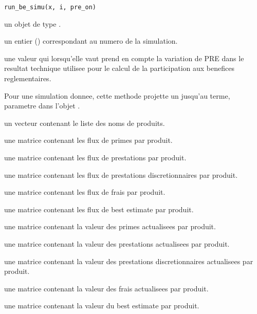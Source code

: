\documentclass[a4paper]{book}
\begin{document}
%
\begin{Usage}
\begin{verbatim}
run_be_simu(x, i, pre_on)
\end{verbatim}
\end{Usage}
%
\begin{Arguments}
\begin{ldescription}
\item[\code{x}] un objet de type .

\item[\code{i}] un entier () correspondant au numero de la simulation.

\item[\code{pre\_on}] une valeur  qui lorsqu'elle vaut  prend en compte la variation
de PRE dans le resultat technique utilisee pour le calcul de la participation aux benefices reglementaires.
\end{ldescription}
\end{Arguments}
%
\begin{Details}\relax
Pour une simulation donnee, cette methode projette un  jusqu'au terme, parametre dans
l'objet .
\end{Details}
%
\begin{Value}
 un vecteur contenant le liste des noms de produits.

 une matrice contenant les flux de primes par produit.

 une matrice contenant les flux de prestations par produit.

 une matrice contenant les flux de prestations discretionnaires par produit.

 une matrice contenant les flux de frais par produit.

 une matrice contenant les flux de best estimate par produit.

 une matrice contenant la valeur des primes actualisees par produit.

 une matrice contenant la valeur des prestations actualisees par produit.

 une matrice contenant la valeur des prestations
discretionnaires actualisees par produit.

 une matrice contenant la valeur des frais actualisees par produit.

 une matrice contenant la valeur du best estimate par produit.
\end{Value}
\end{document}

